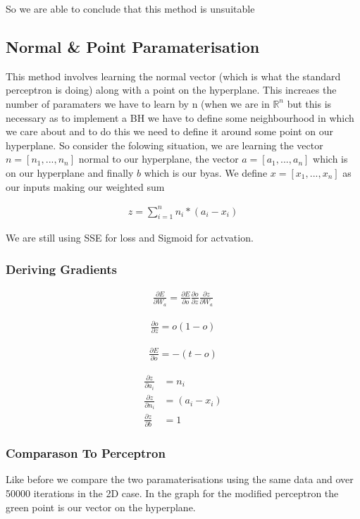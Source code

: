 \documentclass{article}
\begin{document}
So we are able to conclude that this method is unsuitable

\subsection{Normal \& Point Paramaterisation}
This method involves learning the normal vector (which is what the standard perceptron is doing) along with a point on the hyperplane. This increaes the number of paramaters we have to learn by n (when we are in $\mathbb{R}^n$ but this is necessary as to implement a BH we have to define some neighbourhood in which we care about and to do this we need to define it around some point on our hyperplane. So consider the folowing situation, we are learning the vector $n = [n_1, ..., n_n]$ normal to our hyperplane, the vector $a = [a_1, ..., a_n]$ which is on our hyperplane and finally $b$ which is our byas. We define $x = [x_1, ..., x_n]$ as our inputs making our weighted sum

\begin{align*}
z = \sum_{i=1}^n n_i * (a_i - x_i)
\end{align*}

We are still using SSE for loss and Sigmoid for actvation.

\subsubsection{Deriving Gradients}
\begin{align}
\frac{\partial E}{\partial W_a} = \frac{\partial E}{\partial o} \frac{\partial o}{\partial z} \frac{\partial z}{\partial W_a}
\end{align}

\begin{align}
\frac{\partial o}{\partial z} = o(1 - o)
\end{align}

\begin{align}
\frac{\partial E}{\partial o} = -(t - o)
\end{align}

\begin{align}
\frac{\partial z}{\partial a_i} &= n_i\\
\frac{\partial z}{\partial n_i} &= (a_i - x_i)\\
\frac{\partial z}{\partial b} &= 1
\end{align}

\subsubsection{Comparason To Perceptron}
Like before we compare the two paramaterisations using the same data and over 50000 iterations in the 2D case. In the graph for the modified perceptron the green point is our vector on the hyperplane.
\end{document}
